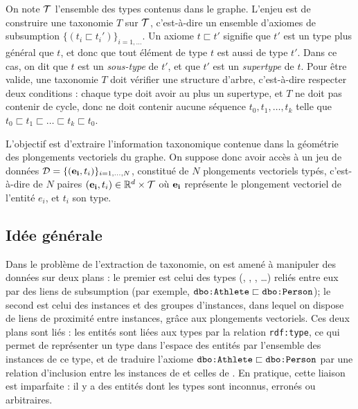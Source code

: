 On note $\cal{T}$ l'ensemble des types contenus dans le graphe. L'enjeu est de construire une taxonomie $T$ sur $\cal{T}$, c'est-à-dire un ensemble d'axiomes de subsumption $\{(t_i \sqsubset t_i')\}_{i=1, \ldots}$. Un axiome $t \sqsubset t'$ signifie que $t'$ est un type plus général que $t$, et donc que tout élément de type $t$ est aussi de type $t'$. Dans ce cas, on dit que $t$ est un \textit{sous-type} de $t'$, et que $t'$ est un \textit{supertype} de $t$.
Pour être valide, une taxonomie $T$ doit vérifier une structure d'arbre, c'est-à-dire respecter deux conditions : chaque type doit avoir au plus un supertype, et $T$ ne doit pas contenir de cycle, donc ne doit contenir aucune séquence $t_0, t_1, \ldots, t_k$ telle que $t_0 \sqsubset t_1 \sqsubset \ldots \sqsubset t_k \sqsubset t_0$.


L'objectif est d'extraire l'information taxonomique contenue dans la géométrie des plongements vectoriels du graphe. On suppose donc avoir accès à un jeu de données $\cal{D} = \{ (\mathbf{e_i}, t_i) \}_{i=1, \ldots, N}$, constitué de $N$ plongements vectoriels typés, c'est-à-dire de $N$ paires $(\bf{e_i}, t_i) \in \R^d \times \cal{T}$ où $\bf{e_i}$ représente le plongement vectoriel de l'entité $e_i$, et $t_i$ son type. 


\subsection{Idée générale}

Dans le problème de l'extraction de taxonomie, on est amené à manipuler des données sur deux plans : le premier est celui des types (, , , \ldots) reliés entre eux par des liens de subsumption (par exemple, $\dbo{Athlete} \sqsubset \dbo{Person}$); le second est celui des instances et des groupes d'instances, dans lequel on dispose de liens de proximité entre instances, grâce aux plongements vectoriels. %
Ces deux plans sont liés : les entités sont liées aux types par la relation \texttt{rdf:type}, ce qui permet de représenter un type dans l'espace des entités par l'ensemble des instances de ce type, et de traduire l'axiome $\dbo{Athlete} \sqsubset \dbo{Person}$ par une relation d'inclusion entre les instances de  et celles de . En pratique, cette liaison est imparfaite : il y a des entités dont les types sont inconnus, erronés ou arbitraires.

